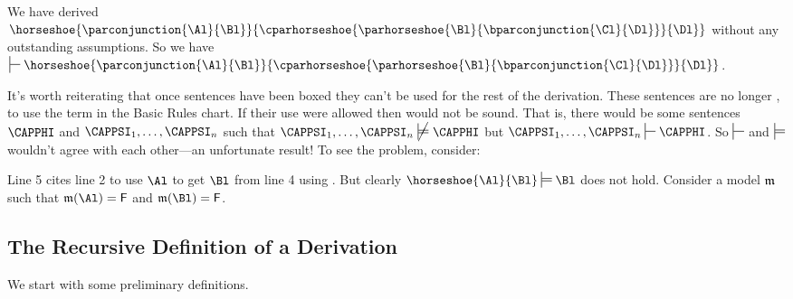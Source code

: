 \begin{gproof}[\label{secondexamplefinished}]
\end{gproof}
\noindent{}We have derived $\horseshoe{\parconjunction{\Al}{\Bl}}{\cparhorseshoe{\parhorseshoe{\Bl}{\bparconjunction{\Cl}{\Dl}}}{\Dl}}$ without any outstanding assumptions.
So we have $\sststile{}{}\horseshoe{\parconjunction{\Al}{\Bl}}{\cparhorseshoe{\parhorseshoe{\Bl}{\bparconjunction{\Cl}{\Dl}}}{\Dl}}$.

It's worth reiterating that once sentences have been boxed they can't be used for the rest of the derivation.
These sentences are no longer , to use the term in the Basic Rules chart.
If their use were allowed then \GSD{} would not be sound.
That is, there would be some sentences $\CAPPHI$ and $\CAPPSI_1,\ldots,\CAPPSI_{\integer{n}}$ such that $\CAPPSI_1,\ldots,\CAPPSI_{\integer{n}}\text{ }\cancel{\sdtstile{}{}}\text{ }\CAPPHI$ but $\CAPPSI_1,\ldots,\CAPPSI_{\integer{n}}\sststile{}{}\CAPPHI$.
So $\sststile{}{}$ and $\sdtstile{}{}$ wouldn't agree with each other---an unfortunate result!
To see the problem, consider:
\begin{gproof}
\end{gproof}
\noindent{}Line 5 cites line 2 to use $\Al$ to get $\Bl$ from line 4 using . 
But clearly $\horseshoe{\Al}{\Bl}\sdtstile{}{}\Bl$ does not hold. 
Consider a model $\mathfrak{m}$ such that $\IntA(\Al)=\FalseB$ and $\IntA(\Bl)=\FalseB$.

\subsection{The Recursive Definition of a Derivation}\label{RecDefOfDerv}
We start with some preliminary definitions.

